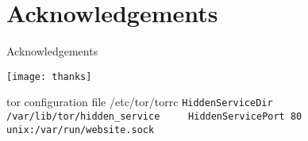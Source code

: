 \section*{Acknowledgements}
\begin{frame}{Acknowledgements}
    \begin{center}
        \texttt{[image: thanks]}
    \end{center}
\end{frame}

\begin{frame}{tor configuration file /etc/tor/torrc}
    \label{torConfig}
    \lstinline{HiddenServiceDir /var/lib/tor/hidden_service
    HiddenServicePort 80 unix:/var/run/website.sock}
\end{frame}